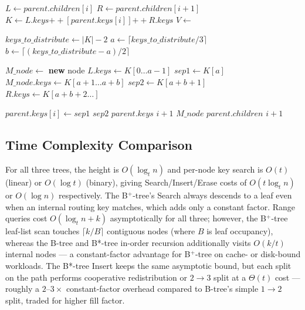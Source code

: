 \documentclass[sigconf]{acmart}
\begin{document}
\addtocounter{algorithm}{-1}
\begin{algorithm}[tbp]
\caption{B* Tree Split and Redistribution (Continued)}
\begin{algorithmic}[1]
    \State $L \gets parent.children[i]$
    \State $R \gets parent.children[i+1]$
    \State $K \gets L.keys \mathbin{++} [parent.keys[i]] \mathbin{++} R.keys$
    \State $V \gets$ 
    
    \State $keys\_to\_distribute \gets |K| - 2$
    \State $a \gets \lceil keys\_to\_distribute / 3 \rceil$
    \State $b \gets \lceil (keys\_to\_distribute - a) / 2 \rceil$
    
    \State $M\_node \gets$ \textbf{new} node
    \State $L.keys \gets K[0 \dots a - 1]$
    \State $sep1 \gets K[a]$
    \State $M\_node.keys \gets K[a + 1 \dots a + b]$
    \State $sep2 \gets K[a + b + 1]$
    \State $R.keys \gets K[a + b + 2 \dots]$
    
    \State $parent.keys[i] \gets sep1$
    \State {} $sep2$  $parent.keys$  $i+1$
    \State {} $M\_node$  $parent.children$  $i+1$
\EndProcedure
\end{algorithmic}
\end{algorithm}

\subsection{Time Complexity Comparison}
For all three trees, the height is $O(\log_t n)$ and per-node key search is $O(t)$ (linear) or $O(\log t)$ (binary), giving Search/Insert/Erase costs of $O(t \log_t n)$ or $O(\log n)$ respectively. The B$^+$-tree's Search always descends to a leaf even when an internal routing key matches, which adds only a constant factor. Range queries cost $O(\log_t n + k)$ asymptotically for all three; however, the B$^+$-tree leaf-list scan touches $\lceil k/B \rceil$ contiguous nodes (where $B$ is leaf occupancy), whereas the B-tree and B*-tree in-order recursion additionally visits $O(k/t)$ internal nodes --- a constant-factor advantage for B$^+$-tree on cache- or disk-bound workloads. The B*-tree Insert keeps the same asymptotic bound, but each split on the path performs cooperative redistribution or $2 \to 3$ split at a $\Theta(t)$ cost --- roughly a $2$--$3\times$ constant-factor overhead compared to B-tree's simple $1 \to 2$ split, traded for higher fill factor.
\end{document}
